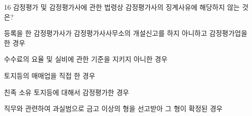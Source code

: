 \begin{question}{16}
감정평가 및 감정평가사에 관한 법령상 감정평가사의 징계사유에 해당하지 않는 것은?
\begin{choices}
  \item 등록을 한 감정평가사가 감정평가사사무소의 개설신고를 하지 아니하고 감정평가업을 한 경우
  \item 수수료의 요율 및 실비에 관한 기준을 지키지 아니한 경우
  \item 토지등의 매매업을 직접 한 경우
  \item 친족 소유 토지등에 대해서 감정평가한 경우
  \item 직무와 관련하여 과실범으로 금고 이상의 형을 선고받아 그 형이 확정된 경우
\end{choices}
\end{question}
